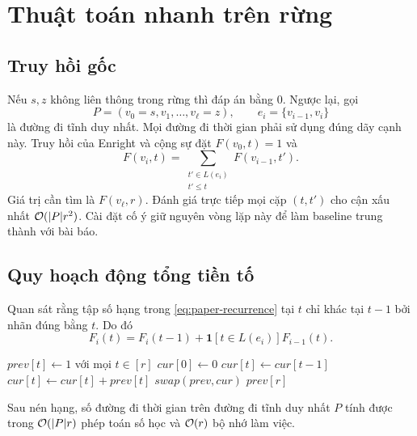 \chapter{Thuật toán nhanh trên rừng}
\label{chap:forests}

\section{Truy hồi gốc}

Nếu $s,z$ không liên thông trong rừng thì đáp án bằng $0$. Ngược lại, gọi
\[
  P=(v_0=s,v_1,\ldots,v_\ell=z),\qquad e_i=\{v_{i-1},v_i\}
\]
là đường đi tĩnh duy nhất. Mọi đường đi thời gian phải sử dụng đúng dãy cạnh này. Truy hồi của Enright và cộng sự đặt $F(v_0,t)=1$ và
\begin{equation}
\label{eq:paper-recurrence}
  F(v_i,t)=\sum_{\substack{t'\in L(e_i)\\t'\le t}}F(v_{i-1},t').
\end{equation}
Giá trị cần tìm là $F(v_\ell,r)$. Đánh giá trực tiếp mọi cặp $(t,t')$ cho cận xấu nhất $\mathcal{O}(|P|r^2)$. Cài đặt  cố ý giữ nguyên vòng lặp này để làm baseline trung thành với bài báo.

\section{Quy hoạch động tổng tiền tố}

Quan sát rằng tập số hạng trong \cref{eq:paper-recurrence} tại $t$ chỉ khác tại $t-1$ bởi nhãn đúng bằng $t$. Do đó
\begin{equation}
\label{eq:prefix-recurrence}
  F_i(t)=F_i(t-1)+\mathbf{1}[t\in L(e_i)]F_{i-1}(t).
\end{equation}

\begin{algorithm}[htbp]
\caption{: tổng tiền tố dày}
\label{alg:forest-dense}
\begin{algorithmic}[1]
\State $\textit{prev}[t]\gets1$ với mọi $t\in[r]$
  \State $\textit{cur}[0]\gets0$
    \State $\textit{cur}[t]\gets\textit{cur}[t-1]$
      \State $\textit{cur}[t]\gets\textit{cur}[t]+\textit{prev}[t]$
    \EndIf
  \EndFor
  \State $\textit{swap}(\textit{prev},\textit{cur})$
\EndFor
\State \Return $\textit{prev}[r]$
\end{algorithmic}
\end{algorithm}

\begin{theorem}
Sau nén hạng, số đường đi thời gian trên đường đi tĩnh duy nhất $P$ tính được trong $\mathcal{O}(|P|r)$ phép toán số học và $\mathcal{O}(r)$ bộ nhớ làm việc.
\end{theorem}

